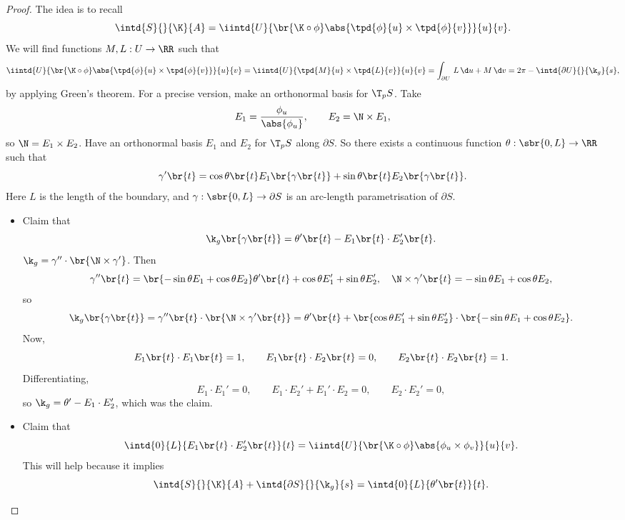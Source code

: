 \begin{proof}
The idea is to recall
$$ \intd{S}{}{\K}{A} = \iintd{U}{\br{\K \circ \phi}\abs{\tpd{\phi}{u} \times \tpd{\phi}{v}}}{u}{v}. $$
We will find functions $ M, L : U \to \RR $ such that
$$ \iintd{U}{\br{\K \circ \phi}\abs{\tpd{\phi}{u} \times \tpd{\phi}{v}}}{u}{v} = \iintd{U}{\tpd{M}{u} \times \tpd{L}{v}}{u}{v} = \int_{\partial U} \, L \, \d u + M \, \d v = 2\pi - \intd{\partial U}{}{\k_g}{s}, $$
by applying Green's theorem. For a precise version, make an orthonormal basis for $ \T_p S $. Take
$$ E_1 = \dfrac{\phi_u}{\abs{\phi_u}}, \qquad E_2 = \N \times E_1, $$
so $ \N = E_1 \times E_2 $. Have an orthonormal basis $ E_1 $ and $ E_2 $ for $ \T_p S $ along $ \partial S $. So there exists a continuous function $ \theta : \sbr{0, L} \to \RR $ such that
$$ \gamma'\br{t} = \cos \theta\br{t}E_1\br{\gamma\br{t}} + \sin \theta\br{t}E_2\br{\gamma\br{t}}. $$
Here $ L $ is the length of the boundary, and $ \gamma : \sbr{0, L} \to \partial S $ is an arc-length parametrisation of $ \partial S $.
\begin{itemize}
\item Claim that
$$ \k_g\br{\gamma\br{t}} = \theta'\br{t} - E_1\br{t} \cdot E_2'\br{t}. $$
$ \k_g = \gamma'' \cdot \br{\N \times \gamma'} $. Then
$$ \gamma''\br{t} = \br{-\sin \theta E_1 + \cos \theta E_2}\theta'\br{t} + \cos \theta E_1' + \sin \theta E_2', \quad \N \times \gamma'\br{t} = -\sin \theta E_1 + \cos \theta E_2, $$
so
$$ \k_g\br{\gamma\br{t}} = \gamma''\br{t} \cdot \br{\N \times \gamma'\br{t}} = \theta'\br{t} + \br{\cos \theta E_1' + \sin \theta E_2'} \cdot \br{-\sin \theta E_1 + \cos \theta E_2}. $$
Now,
$$ E_1\br{t} \cdot E_1\br{t} = 1, \qquad E_1\br{t} \cdot E_2\br{t} = 0, \qquad E_2\br{t} \cdot E_2\br{t} = 1. $$
Differentiating,
$$ E_1 \cdot E_1' = 0, \qquad E_1 \cdot E_2' + E_1' \cdot E_2 = 0, \qquad E_2 \cdot E_2' = 0, $$
so $ \k_g = \theta' - E_1 \cdot E_2' $, which was the claim.


\item Claim that
$$ \intd{0}{L}{E_1\br{t} \cdot E_2'\br{t}}{t} = \iintd{U}{\br{\K \circ \phi}\abs{\phi_u \times \phi_v}}{u}{v}. $$
This will help because it implies
$$ \intd{S}{}{\K}{A} + \intd{\partial S}{}{\k_g}{s} = \intd{0}{L}{\theta'\br{t}}{t}. $$

\pagebreak


\end{itemize}
\end{proof}

